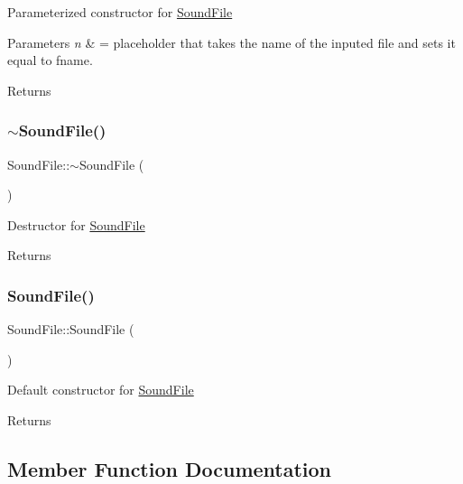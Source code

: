 Parameterized constructor for \hyperlink{classSoundFile}{Sound\+File} 
\begin{DoxyParams}{Parameters}
{\em n} & = placeholder that takes the name of the inputed file and sets it equal to fname. \\
\hline
\end{DoxyParams}
\begin{DoxyReturn}{Returns}

\end{DoxyReturn}
\mbox{\label{classSoundFile_a2a4cc3a7780cc699e1ef51fc98f5d846}} 
\subsubsection{\texorpdfstring{$\sim$\+Sound\+File()}{~SoundFile()}}
{\footnotesize\ttfamily Sound\+File\+::$\sim$\+Sound\+File (\begin{DoxyParamCaption}{ }\end{DoxyParamCaption})}

Destructor for \hyperlink{classSoundFile}{Sound\+File} \begin{DoxyReturn}{Returns}

\end{DoxyReturn}
\mbox{\label{classSoundFile_a6b4a3ffaf85f0f60b8c311185ea8bd58}} 
\subsubsection{\texorpdfstring{Sound\+File()}{SoundFile()}\hspace{0.1cm}{\footnotesize\ttfamily [2/2]}}
{\footnotesize\ttfamily Sound\+File\+::\+Sound\+File (\begin{DoxyParamCaption}{ }\end{DoxyParamCaption})}

Default constructor for \hyperlink{classSoundFile}{Sound\+File} \begin{DoxyReturn}{Returns}

\end{DoxyReturn}


\subsection{Member Function Documentation}
\mbox{\label{classSoundFile_a0455dae80379afda92f2900a74b4f44a}} 
